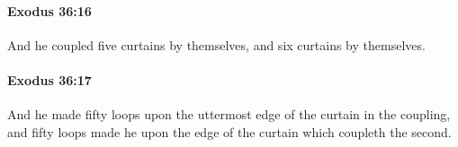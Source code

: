 		\paragraph{Exodus 36:16} %
			\label{EXODUS-36-16}

			And he coupled five curtains by themselves, and six curtains by themselves.


		\paragraph{Exodus 36:17} %
			\label{EXODUS-36-17}

			And he made fifty loops upon the uttermost edge of the curtain in the coupling, and fifty loops made he upon the edge of the curtain which coupleth the second.


